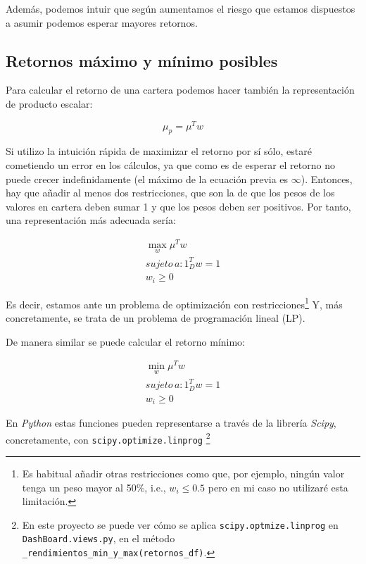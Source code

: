 Además, podemos intuir que según aumentamos el riesgo que estamos dispuestos a asumir podemos esperar mayores retornos. 

\subsection{Retornos máximo y mínimo posibles}

Para calcular el retorno de una cartera podemos hacer también la representación de producto escalar:

\begin{equation}
	\mu_{p} = \mu^{T}w
\end{equation}

Si utilizo la intuición rápida de maximizar el retorno por sí sólo, estaré cometiendo un error en los cálculos, ya que como es de esperar el retorno no puede crecer indefinidamente (el máximo de la ecuación previa es $\infty$). Entonces, hay que añadir al menos dos restricciones, que son la de que los pesos de los valores en cartera deben sumar 1 y que los pesos deben ser positivos. Por tanto, una representación más adecuada sería:

\begin{equation}
\begin{aligned}
	\max_{w} \mu^{T}w \\
	sujeto\, a: 1_{D}^{T}w = 1 \\
	w_{i} \geq 0
\end{aligned}
\end{equation}

Es decir, estamos ante un problema de optimización con restricciones\footnote{Es habitual añadir otras restricciones como que, por ejemplo, ningún valor tenga un peso mayor al 50\%, i.e., $w_{i} \leq 0.5$ pero en mi caso no utilizaré esta limitación.} Y, más concretamente, se trata de un problema de programación lineal (LP)\citep{programacion_lineal}. 

De manera similar se puede calcular el retorno mínimo:

\begin{equation}
\begin{aligned}
	\min_{w} \mu^{T}w \\
	sujeto\, a: 1_{D}^{T}w = 1 \\
	w_{i} \geq 0
\end{aligned}
\end{equation}

En \emph{Python} estas funciones pueden representarse a través de la librería \emph{Scipy}, concretamente, con \texttt{scipy.optimize.linprog} \footnote{En este proyecto se puede ver cómo se aplica \texttt{scipy.optmize.linprog} en \texttt{DashBoard.views.py}, en el método \texttt{\_rendimientos\_min\_y\_max(retornos\_df)}.}

